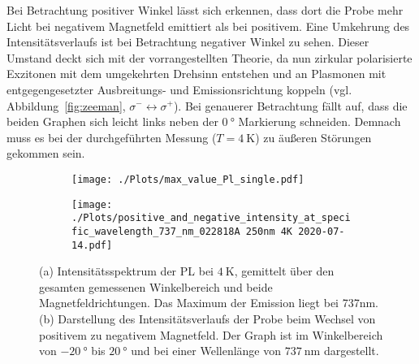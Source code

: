 Bei Betrachtung positiver Winkel lässt sich erkennen, dass dort die Probe mehr Licht bei negativem
Magnetfeld emittiert als bei positivem.
Eine Umkehrung des Intensitätsverlaufs ist bei Betrachtung negativer Winkel zu sehen.
Dieser Umstand deckt sich mit der vorrangestellten Theorie, da nun zirkular polarisierte Exzitonen mit dem 
umgekehrten Drehsinn entstehen und an Plasmonen mit entgegengesetzter Ausbreitungs- und Emissionsrichtung koppeln
(vgl. Abbildung~\ref{fig:zeeman}, $\sigma^- \leftrightarrow \sigma^+$).
Bei genauerer Betrachtung fällt auf, dass die beiden Graphen sich leicht links neben der $\SI{0}{\degree}$
Markierung schneiden.
Demnach muss es bei der durchgeführten Messung ($T = \SI{4}{\kelvin}$) zu äußeren Störungen gekommen sein.
\begin{figure}
    \begin{subfigure}{0.5\textwidth}
        \texttt{[image: ./Plots/max\_value\_Pl\_single.pdf]}
        \caption{}
        \label{fig:max}
    \end{subfigure}
    \begin{subfigure}{0.5\textwidth}
        \texttt{[image: ./Plots/positive\_and\_negative\_intensity\_at\_specific\_wavelength\_737\_nm\_022818A 250nm 4K 2020-07-14.pdf]}
        \caption{}
        \label{fig:i_pn}
    \end{subfigure}
    \caption{(a) Intensitätsspektrum der PL bei $\SI{4}{\kelvin}$, gemittelt über den gesamten gemessenen 
                Winkelbereich und beide Magnetfeldrichtungen. Das Maximum der Emission liegt bei 737nm.
             (b) Darstellung des Intensitätsverlaufs der Probe beim Wechsel von positivem zu negativem Magnetfeld.
             Der Graph ist im Winkelbereich von $\SI{-20}{\degree}$ bis $\SI{20}{\degree}$ und bei einer Wellenlänge von 
             $\SI{737}{\nano\meter}$ dargestellt.
              }
    \label{fig:rho}
\end{figure}
\FloatBarrier
